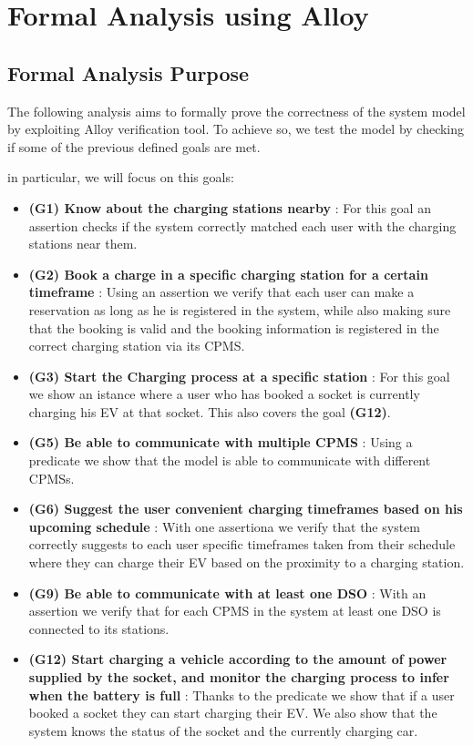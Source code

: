\documentclass[table, 12pt]{article} %
\begin{document}
    \newpage
    \section{Formal Analysis using Alloy}
    \subsection{Formal Analysis Purpose}
    The following analysis aims to formally prove the correctness of the system model by exploiting Alloy verification tool. To achieve so, we test the model by checking if some of the previous defined goals are met. 

    in particular, we will focus on this goals:
    \begin{itemize}
        \item \textbf{(G1) Know about the charging stations nearby }: For this goal an assertion checks if the system correctly matched each user with the charging stations near them. 
        \item \textbf{(G2) Book a charge in a specific charging station for a certain timeframe }: Using an assertion we verify that each user can make a reservation as long as he is registered in the system, while also making sure that the booking is valid and the booking information is registered in the correct charging station via its CPMS.
        \item \textbf{(G3) Start the Charging process at a specific station }: For this goal we show an istance where a user who has booked a socket is currently charging his EV at that socket. This also covers the goal \textbf{(G12)}.
        \item \textbf{(G5) Be able to communicate with multiple CPMS }: Using a predicate we show that the model is able to communicate with different CPMSs.
        \item \textbf{(G6) Suggest the user convenient charging timeframes based on his upcoming schedule }: With one assertiona we verify that the system correctly suggests to each user specific timeframes taken from their schedule where they can charge their EV based on the proximity to a charging station.
        \item \textbf{(G9) Be able to communicate with at least one DSO }: With an assertion we verify that for each CPMS in the system at least one DSO is connected to its stations. 
        \item \textbf{(G12) Start charging a vehicle according to the amount of power supplied by the socket, and monitor the charging process to infer when the battery is full }: Thanks to the predicate we show that if a user booked a socket they can start charging their EV. We also show that the system knows the status of the socket and the currently charging car.

\end{itemize}
\end{document}
